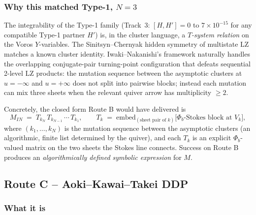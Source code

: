 \documentclass[11pt]{article}
\begin{document}
\subsubsection*{Why this matched Type-1, $N=3$}

The integrability of the Type-1 family (Track~3: $[H,H']=0$ to
$7\times10^{-15}$ for any compatible Type-1 partner $H'$) is, in the
cluster language, a \emph{$T$-system relation} on the Voros
$Y$-variables. The Sinitsyn--Chernyak hidden symmetry of multistate
LZ matches a known cluster identity. Iwaki--Nakanishi's framework
naturally handles the overlapping conjugate-pair turning-point
configuration that defeats sequential 2-level LZ products: the
mutation sequence between the asymptotic clusters at $u=-\infty$ and
$u=+\infty$ does not split into pairwise blocks; instead each
mutation can mix three sheets when the relevant quiver arrow has
multiplicity $\ge 2$.

Concretely, the closed form Route B would have delivered is
\[
M_{IN}
\;=\;
T_{k_N}\,T_{k_{N-1}}\,\cdots\,T_{k_1},
\qquad
T_k \;=\; \mathrm{embed}_{(\text{sheet pair of }k)}\!
       \bigl[\Phi_b\text{-Stokes block at }V_k\bigr],
\]
where $(k_1,\ldots,k_N)$ is the mutation sequence between the
asymptotic clusters (an algorithmic, finite list determined by the
quiver), and each $T_k$ is an explicit $\Phi_b$-valued matrix on the
two sheets the Stokes line connects. Success on Route B produces an
\emph{algorithmically defined symbolic expression} for $M$.

\subsection{Route C -- Aoki--Kawai--Takei DDP}
\label{sec:route-c}

\subsubsection*{What it is}
\end{document}
